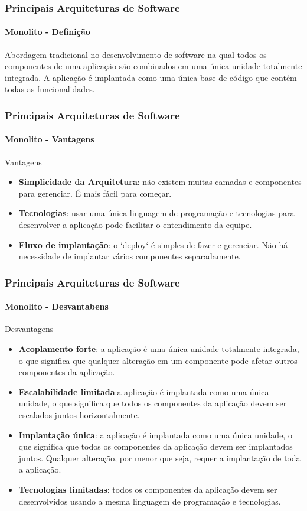 \documentclass[
	10pt, %
	t, %
]{beamer}
\begin{document}
\begin{frame}
	\frametitle{Principais Arquiteturas de Software}
	\framesubtitle{Monolito - Definição}
	
	Abordagem tradicional no desenvolvimento de software na qual todos os componentes de uma aplicação são combinados em uma única unidade totalmente integrada. A aplicação é implantada como uma \alert{única base de código} que contém todas as funcionalidades.

\end{frame}

\begin{frame}
	\frametitle{Principais Arquiteturas de Software}
	\framesubtitle{Monolito - Vantagens}

	\begin{exampleblock}{Vantagens}
		\begin{itemize}
			\item \textbf{Simplicidade da Arquitetura}: não existem muitas camadas e componentes para gerenciar. É mais fácil para começar.
			\item \textbf{Tecnologias}: usar uma única linguagem de programação e tecnologias para desenvolver a aplicação pode facilitar o entendimento da equipe.
			\item \textbf{Fluxo de implantação}: o `deploy` é simples de fazer e gerenciar. Não há necessidade de implantar vários componentes separadamente.
		\end{itemize}
	\end{exampleblock}

\end{frame}

\begin{frame}
	\frametitle{Principais Arquiteturas de Software}
	\framesubtitle{Monolito - Desvantabens}

	\begin{alertblock}{Desvantagens}
		\begin{itemize}
			\item \textbf{Acoplamento forte}: a aplicação é uma única unidade totalmente integrada, o que significa que qualquer alteração em um componente pode afetar outros componentes da aplicação.
			\item \textbf{Escalabilidade limitada}:a aplicação é implantada como uma única unidade, o que significa que todos os componentes da aplicação devem ser escalados juntos horizontalmente.
			\item \textbf{Implantação única}: a aplicação é implantada como uma única unidade, o que significa que todos os componentes da aplicação devem ser implantados juntos. Qualquer alteração, por menor que seja, requer a implantação de toda a aplicação.
			\item \textbf{Tecnologias limitadas}: todos os componentes da aplicação devem ser desenvolvidos usando a mesma linguagem de programação e tecnologias.
		\end{itemize}
	\end{alertblock}

\end{frame}
\end{document}
